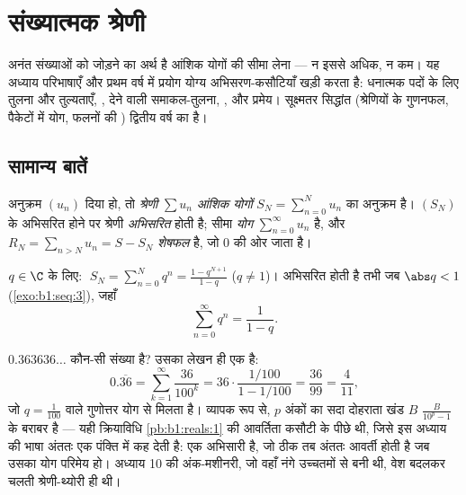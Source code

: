 \chapter{संख्यात्मक श्रेणी}\label{ch:b1:series}

अनंत संख्याओं को जोड़ने का अर्थ है आंशिक योगों की सीमा लेना --- न इससे अधिक,
न कम। यह अध्याय परिभाषाएँ और प्रथम वर्ष में प्रयोग योग्य अभिसरण-कसौटियाँ
खड़ी करता है: धनात्मक पदों के लिए तुलना और तुल्यताएँ, ,  देने वाली समाकल-तुलना, , और  प्रमेय।
सूक्ष्मतर सिद्धांत (श्रेणियों के गुणनफल, पैकेटों में योग, फलनों की )
द्वितीय वर्ष का है।

\section{सामान्य बातें}

\begin{definition}\label{def:b1:series:def}
अनुक्रम $(u_n)$ दिया हो, तो \emph{श्रेणी} $\sum u_n$
\emph{आंशिक योगों} $S_N = \sum_{n=0}^{N} u_n$ का अनुक्रम है। $(S_N)$ के
अभिसरित होने पर श्रेणी \emph{अभिसरित} होती है; सीमा \emph{योग}
$\sum_{n=0}^{\infty} u_n$ है, और $R_N = \sum_{n > N} u_n = S - S_N$
\emph{शेषफल} है, जो $0$ की ओर जाता है।
\end{definition}

\begin{example}[गुणोत्तर श्रेणी]\label{ex:b1:series:geometric}
$q \in \C$ के लिए: $\;S_N = \sum_{n=0}^{N} q^n = \frac{1 - q^{N+1}}{1-q}$
($q \neq 1$)।  अभिसरित होती है तभी जब $\abs q < 1$
(\cref{exo:b1:seq:3}), जहाँ
\[
\sum_{n=0}^{\infty} q^n = \frac{1}{1 - q} .
\]
\end{example}

\begin{example}\label{ex:b1:series:periodicdecimal}
$0.363636\dots$ कौन-सी संख्या है? उसका लेखन ही एक  है:
\[
0.\overline{36} = \sum_{k=1}^{\infty} \frac{36}{100^k}
= 36\cdot\frac{1/100}{1 - 1/100} = \frac{36}{99} =
\frac{4}{11} ,
\]
जो $q = \frac{1}{100}$ वाले गुणोत्तर योग से मिलता है। व्यापक रूप से, $p$
अंकों का सदा दोहराता खंड $B$ $\frac{B}{10^p - 1}$ के बराबर है --- यही
क्रियाविधि \cref{pb:b1:reals:1} की आवर्तिता कसौटी के पीछे थी, जिसे इस अध्याय
की भाषा अंततः एक पंक्ति में कह देती है:  एक अभिसारी  है,
जो ठीक तब अंततः आवर्ती होती है जब उसका योग परिमेय हो। अध्याय 10 की
अंक-मशीनरी, जो वहाँ नंगे उच्चतमों से बनी थी, वेश बदलकर चलती श्रेणी-थ्योरी ही
थी।
\end{example}

